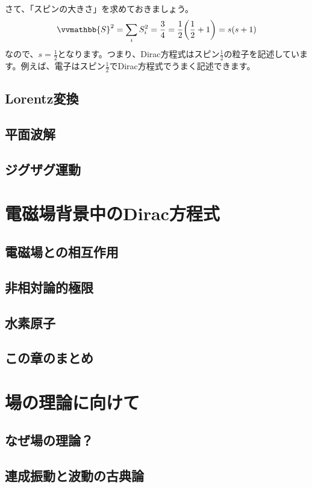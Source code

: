 \documentclass[report,paper=a4, fontsize=12pt, line_length=16cm, number_of_lines=33,dvipdfmx]{jlreq}
\numberwithin{equation}{chapter}
\newcommand{\Sb}{\vvmathbb{S}}
\begin{document}
さて、「スピンの大きさ」を求めておきましょう。
\begin{align}
  \Sb^2=\sum_{i}S_i^2=\frac{3}{4}=\frac{1}{2}\qty(\frac{1}{2}+1)=s(s+1)
\end{align}
なので、$s=\frac{1}{2}$となります。つまり、Dirac方程式はスピン$\frac{1}{2}$の粒子を記述しています。例えば、電子はスピン$\frac{1}{2}$でDirac方程式でうまく記述できます。

\section{Lorentz変換}
\section{平面波解}
\section{ジグザグ運動}



\chapter{電磁場背景中のDirac方程式}
\section{電磁場との相互作用}
\section{非相対論的極限}
\section{水素原子}
\section{この章のまとめ}



\chapter{場の理論に向けて}
\section{なぜ場の理論？}
\section{連成振動と波動の古典論}
\end{document}
